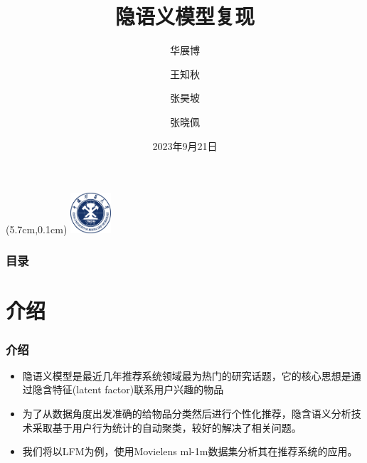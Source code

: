 \documentclass{beamer}
\title[LFM]{隐语义模型复现}
\author[Authors]{华展博 \and 王知秋 \and 张昊坡 \and 张晓佩}
\institute[CUMT]{计算机科学与技术学院 \\ 中国矿业大学}
\date{2023年9月21日}
\begin{document}
\begin{textblock*}{5cm}(5.7cm,0.1cm) %
\includegraphics[width=1.5cm]{fig/logo0.png}
\end{textblock*}

\frame{\titlepage}

\makeatletter
{}
\makeatother

\begin{frame}
	\frametitle{目录}
	\tableofcontents
\end{frame}

\section{介绍}
	\begin{frame}
	\frametitle{介绍}
		\begin{itemize}
  			\item 隐语义模型是最近几年推荐系统领域最为热门的研究话题，它的核心思想是通过隐含特征(latent factor)联系用户兴趣的物品
  			\item 为了从数据角度出发准确的给物品分类然后进行个性化推荐，隐含语义分析技术采取基于用户行为统计的自动聚类，较好的解决了相关问题。
  			\item 我们将以LFM为例，使用Movielens ml-1m数据集分析其在推荐系统的应用。
		\end{itemize}
	\end{frame}

\end{document}
